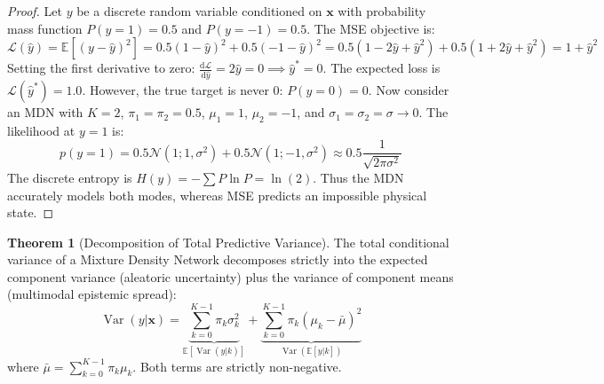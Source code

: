 \documentclass[11pt,a4paper]{article}
\theoremstyle{definition}
\newtheorem{theorem}{\textbf{Theorem}}[section]
\begin{document}
\begin{proof}
Let $y$ be a discrete random variable conditioned on $\mathbf{x}$ with probability mass function $P(y = 1) = 0.5$ and $P(y = -1) = 0.5$.
The MSE objective is:
{\boldmath
\begin{equation}
\mathcal{L}(\hat{y}) = \mathbb{E}[(y - \hat{y})^2] = 0.5 (1 - \hat{y})^2 + 0.5 (-1 - \hat{y})^2 = 0.5 (1 - 2\hat{y} + \hat{y}^2) + 0.5 (1 + 2\hat{y} + \hat{y}^2) = 1 + \hat{y}^2
\end{equation}
}
Setting the first derivative to zero: $\frac{\mathrm{d}\mathcal{L}}{\mathrm{d}\hat{y}} = 2\hat{y} = 0 \implies \hat{y}^* = 0$.
The expected loss is $\mathcal{L}(\hat{y}^*) = 1.0$.
However, the true target is never 0: $P(y = 0) = 0$.
Now consider an MDN with $K = 2$, $\pi_1 = \pi_2 = 0.5$, $\mu_1 = 1$, $\mu_2 = -1$, and $\sigma_1 = \sigma_2 = \sigma \to 0$.
The likelihood at $y = 1$ is:
{\boldmath
\begin{equation}
p(y = 1) = 0.5 \mathcal{N}(1; 1, \sigma^2) + 0.5 \mathcal{N}(1; -1, \sigma^2) \approx 0.5 \frac{1}{\sqrt{2\pi \sigma^2}}
\end{equation}
}
The discrete entropy is $H(y) = -\sum P \ln P = \ln(2)$.
Thus the MDN accurately models both modes, whereas MSE predicts an impossible physical state.
\end{proof}

\begin{theorem}[Decomposition of Total Predictive Variance]
The total conditional variance of a Mixture Density Network decomposes strictly into the expected component variance (aleatoric uncertainty) plus the variance of component means (multimodal epistemic spread):
{\boldmath
\begin{equation}
\operatorname{Var}(y | \mathbf{x}) = \underbrace{\sum_{k=0}^{K-1} \pi_k \sigma_k^2}_{\mathbb{E}[\operatorname{Var}(y | k)]} + \underbrace{\sum_{k=0}^{K-1} \pi_k (\mu_k - \bar{\mu})^2}_{\operatorname{Var}(\mathbb{E}[y | k])}
\end{equation}
}
where $\bar{\mu} = \sum_{k=0}^{K-1} \pi_k \mu_k$. Both terms are strictly non-negative.
\end{theorem}
\end{document}
